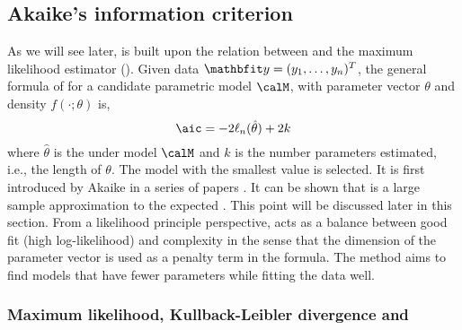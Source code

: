 \subsection{Akaike's information criterion}
\label{sub:Akaike's information criterion}

As we will see later, \aic is built upon the relation between \kl and the
maximum likelihood estimator (\mle). Given data $\data = (y_1,\dots,y_n)^T$,
the general formula of \aic for a candidate parametric model $\calM$, with
parameter vector $\theta$ and density $f(\cdot;\theta)$ is,
\begin{equation}
  \text{\aic} = -2\ell_n(\hat\theta) + 2k
  \label{eq:aic}
\end{equation}
where $\hat\theta$ is the \mle under model $\calM$ and $k$ is the number
parameters estimated, i.e., the length of $\theta$. The model with the
smallest \aic value is selected. It is first introduced by Akaike in a series
of papers \cite{Akaike:1973uc, Akaike:1974ih, Akaike:1977ul}. It can be shown
that \aic is a large sample approximation to the expected \kl
\cite{Akaike:1973uc,Bozdogan:1987wy}. This point will be discussed later in
this section. From a likelihood principle perspective, \aic acts as a balance
between good fit (high log-likelihood) and complexity in the sense that the
dimension of the parameter vector is used as a penalty term in the formula.
The \aic method aims to find models that have fewer parameters while fitting
the data well.

\subsubsection{Maximum likelihood, Kullback-Leibler divergence and
  \protect\aic}
\label{ssub:Maximum likelihood, Kullback-Leiber divergence and aic}


